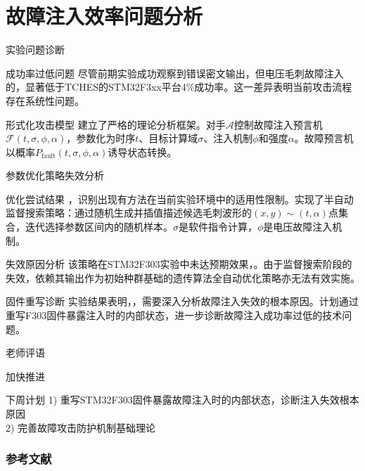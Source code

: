 \documentclass{beamer}
\begin{document}
\section{故障注入效率问题分析}
\begin{frame}{实验问题诊断}
  \begin{block}{成功率过低问题}
    尽管前期实验成功观察到错误密文输出，但电压毛刺故障注入的，显著低于TCHES\cite{TCHES:BozFocPal19}的STM32F3xx平台4\%成功率。这一差异表明当前攻击流程存在系统性问题。
  \end{block}
  
  \begin{block}{形式化攻击模型}
    建立了严格的理论分析框架。对手$\mathcal{A}$控制故障注入预言机$\mathcal{F}(t, \sigma, \phi, \alpha)$，参数化为时序$t$、目标计算域$\sigma$、注入机制$\phi$和强度$\alpha$。故障预言机以概率$P_{\text{fault}}(t, \sigma, \phi, \alpha)$诱导状态转换。
  \end{block}
\end{frame}

\begin{frame}{参数优化策略失效分析}
  \begin{block}{优化尝试结果}
    ，识别出现有方法在当前实验环境中的适用性限制。实现了半自动监督搜索策略：通过随机生成并插值描述候选毛刺波形的$(x,y)\sim (t,\alpha)$点集合，迭代选择参数区间内的随机样本。$\sigma$是软件指令计算，$\phi$是电压故障注入机制。
  \end{block}
  
  \begin{block}{失效原因分析}
    该策略在STM32F303实验中未达预期效果，。由于监督搜索阶段的失效，依赖其输出作为初始种群基础的遗传算法全自动优化策略亦无法有效实施。
  \end{block}

    \begin{block}{固件重写诊断}
    实验结果表明，，需要深入分析故障注入失效的根本原因。计划通过重写F303固件暴露注入时的内部状态，进一步诊断故障注入成功率过低的技术问题。
  \end{block}
\end{frame}

\begin{frame}{老师评语}
  \begin{alertblock}{加快推进}
  \end{alertblock}
  
  \begin{block}{下周计划}
    1) 重写STM32F303固件暴露故障注入时的内部状态，诊断注入失效根本原因 \\
    2) 完善故障攻击防护机制基础理论
  \end{block}
\end{frame}

\begin{frame}[allowframebreaks]
  \frametitle{参考文献}
  
  
\end{frame}
\end{document}
